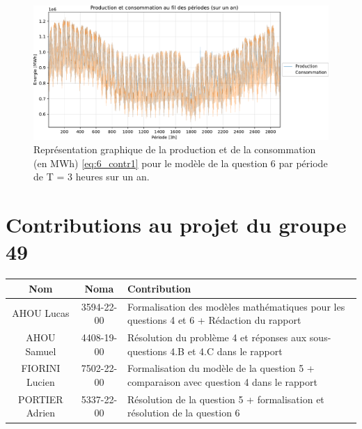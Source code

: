 \documentclass{article}
\begin{document}
\begin{figure}[H]
    \centering
    \includegraphics[scale=0.6]{GraphesP2/Prod_Cons_Q6.pdf}
    \caption{Représentation graphique de la production et de la consommation (en MWh) 
    \eqref{eq:6_contr1} pour le modèle de la question 6 par période de T = 3 heures sur un an.} 
    \label{fig:Q63}
\end{figure}

\newpage
\thispagestyle{empty}
\section*{Contributions au projet du groupe 49}
\begin{table}[h]
    \centering
    \renewcommand{\arraystretch}{2}
    \begin{tabular}{|c|c|p{8cm}|}
        \hline
        \textbf{Nom} & \textbf{Noma} & \textbf{Contribution} \\
        \hline
        AHOU Lucas & 3594-22-00 & Formalisation des modèles mathématiques pour les questions 4 et 6 + Rédaction du rapport \\
        \hline
        AHOU Samuel & 4408-19-00 & Résolution du problème 4 et réponses aux sous-questions 4.B et 4.C dans le rapport \\
        \hline
        FIORINI Lucien & 7502-22-00 & Formalisation du modèle de la question 5 + comparaison avec question 4 dans le rapport\\
        \hline
        PORTIER Adrien & 5337-22-00 & Résolution de la question 5 +  formalisation et résolution de la question 6\\
        \hline
    \end{tabular}
\end{table}
\end{document}

